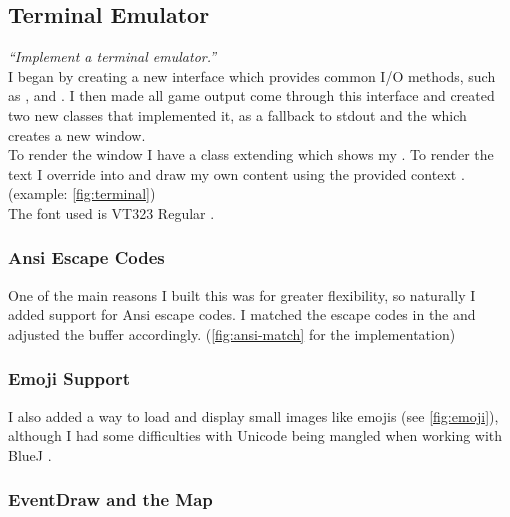 \documentclass{article}
\begin{document}
\begin{multicols}{2}
            \setlength{\parskip}{0.01cm plus4mm minus3mm}

                \subsection{Terminal Emulator}
                \textit{``Implement a terminal emulator.''} \\

                I began by creating a new  interface which provides common I/O methods, such as ,  and . I then made all game output come through this interface and created two new classes that implemented it,  as a fallback to stdout and the  which creates a new window. \\

                To render the window I have a class extending  which shows my . To render the text I override into  and draw my own content using the provided  context \cite{code-ref-7}. (example: \autoref{fig:terminal}) \\

                The font used is VT323 Regular \cite{font}.

                    \subsubsection{Ansi Escape Codes}

                        One of the main reasons I built this was for greater flexibility, so naturally I added support for Ansi escape codes. I matched the escape codes in the  and adjusted the buffer accordingly. (\autoref{fig:ansi-match} for the implementation)

                    \subsubsection{Emoji Support}

                        I also added a way to load and display small images like emojis (see \autoref{fig:emoji}), although I had some difficulties with Unicode being mangled when working with BlueJ \cite{bluej-issue}.

                    \subsubsection{EventDraw and the Map}


\end{multicols}
\end{document}
